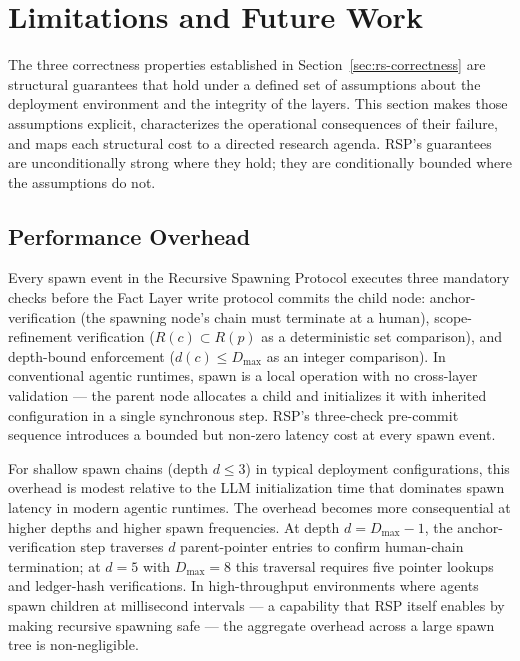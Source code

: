 \section{Limitations and Future Work}\label{sec:rs-limitations}

The three correctness properties established in Section~\ref{sec:rs-correctness} are structural guarantees that hold under a defined set of assumptions about the deployment environment and the integrity of the \bxthree{} layers. This section makes those assumptions explicit, characterizes the operational consequences of their failure, and maps each structural cost to a directed research agenda. RSP's guarantees are unconditionally strong where they hold; they are conditionally bounded where the assumptions do not.

\subsection{Performance Overhead}\label{sec:rs-limitations:performance}

Every spawn event in the Recursive Spawning Protocol executes three mandatory checks before the Fact Layer write protocol commits the child node: anchor-verification (the spawning node's chain must terminate at a human), scope-refinement verification ($R(c) \subset R(p)$ as a deterministic set comparison), and depth-bound enforcement ($d(c) \leq D_{\max}$ as an integer comparison). In conventional agentic runtimes, spawn is a local operation with no cross-layer validation — the parent node allocates a child and initializes it with inherited configuration in a single synchronous step. RSP's three-check pre-commit sequence introduces a bounded but non-zero latency cost at every spawn event.

For shallow spawn chains (depth $d \leq 3$) in typical deployment configurations, this overhead is modest relative to the LLM initialization time that dominates spawn latency in modern agentic runtimes. The overhead becomes more consequential at higher depths and higher spawn frequencies. At depth $d = D_{\max} - 1$, the anchor-verification step traverses $d$ parent-pointer entries to confirm human-chain termination; at $d = 5$ with $D_{\max} = 8$ this traversal requires five pointer lookups and ledger-hash verifications. In high-throughput environments where agents spawn children at millisecond intervals — a capability that RSP itself enables by making recursive spawning safe — the aggregate overhead across a large spawn tree is non-negligible.

